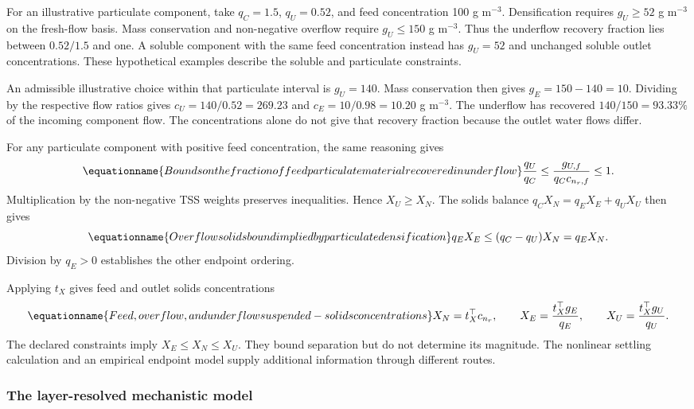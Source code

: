 For an illustrative particulate component, take $q_C=1.5$, $q_U=0.52$, and feed concentration 100 g m$^{-3}$. Densification requires $g_U\ge52$ g m$^{-3}$ on the fresh-flow basis. Mass conservation and non-negative overflow require $g_U\le150$ g m$^{-3}$. Thus the underflow recovery fraction lies between $0.52/1.5$ and one. A soluble component with the same feed concentration instead has $g_U=52$ and unchanged soluble outlet concentrations. These hypothetical examples describe the soluble and particulate constraints.

An admissible illustrative choice within that particulate interval is $g_U=140$. Mass conservation then gives $g_E=150-140=10$. Dividing by the respective flow ratios gives $c_U=140/0.52=269.23$ and $c_E=10/0.98=10.20$ g m$^{-3}$. The underflow has recovered $140/150=93.33\%$ of the incoming component flow. The concentrations alone do not give that recovery fraction because the outlet water flows differ.

For any particulate component with positive feed concentration, the same reasoning gives
\begin{equation}
\equationname{Bounds on the fraction of feed particulate material recovered in underflow}
\frac{q_U}{q_C}\le\frac{g_{U,f}}{q_Cc_{n_r,f}}\le1.
\end{equation}
Multiplication by the non-negative TSS weights preserves inequalities. Hence $X_U\ge X_N$. The solids balance $q_CX_N=q_EX_E+q_UX_U$ then gives
\begin{equation}
\equationname{Overflow solids bound implied by particulate densification}
q_EX_E\le(q_C-q_U)X_N=q_EX_N.
\end{equation}
Division by $q_E>0$ establishes the other endpoint ordering.

Applying $t_X$ gives feed and outlet solids concentrations
\begin{equation}
\equationname{Feed, overflow, and underflow suspended-solids concentrations}
X_N=t_X^\top c_{n_r},\qquad
X_E=\frac{t_X^\top g_E}{q_E},\qquad
X_U=\frac{t_X^\top g_U}{q_U}.
\label{eq:plant_tss_endpoints}
\end{equation}
The declared constraints imply $X_E\le X_N\le X_U$. They bound separation but do not determine its magnitude. The nonlinear settling calculation and an empirical endpoint model supply additional information through different routes.

\subsubsection{The layer-resolved mechanistic model}

